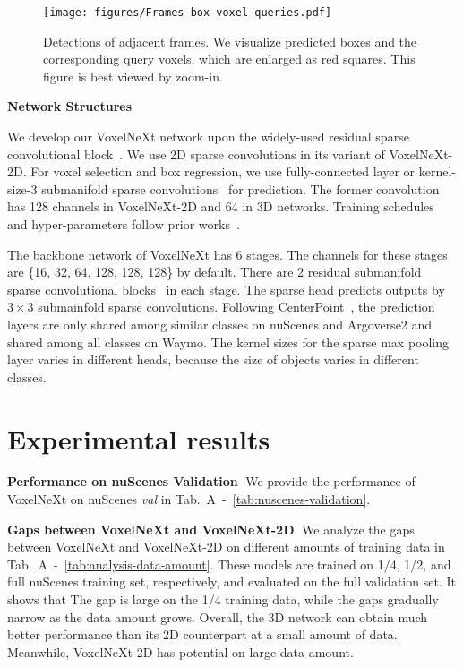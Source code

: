 \documentclass[10pt,twocolumn,letterpaper]{article}
\begin{document}
\begin{figure*}[t]
\begin{center}
   \texttt{[image: figures/Frames-box-voxel-queries.pdf]}
   \caption{Detections of adjacent frames. We visualize predicted boxes and the corresponding query voxels, which are enlarged as red squares. This figure is best viewed by zoom-in.}
   \label{fig:frames-box-query-voxels}
\end{center}
\end{figure*}

\vspace{0.5em}
\noindent
\textbf{Network Structures}

We develop our VoxelNeXt network upon the widely-used residual sparse convolutional block~\cite{centerpoint,pvrcnn,voxel-rcnn}. We use 2D sparse convolutions in its variant of VoxelNeXt-2D. For voxel selection and box regression, we use fully-connected layer or kernel-size-3 submanifold sparse convolutions~\cite{submanifold-sparse-conv-v2} for prediction. The former convolution has 128 channels in VoxelNeXt-2D and 64 in 3D networks. Training schedules and hyper-parameters follow prior works~\cite{pvrcnn,centerpoint}. 

The backbone network of  VoxelNeXt has 6 stages. The channels for these stages are \{16, 32, 64, 128, 128, 128\} by default. There are 2 residual submanifold sparse convolutional blocks~\cite{submanifold-sparse-conv-v2} in each stage. The sparse head predicts outputs by $3\times 3$ submainfold sparse convolutions. Following CenterPoint~\cite{centerpoint}, the prediction layers are only shared among similar classes on nuScenes and Argoverse2 and shared among all classes on Waymo. The kernel sizes for the sparse max pooling layer varies in different heads, because the size of objects varies in different classes.


\section{Experimental results}
\label{sec:experiments-results}
\noindent
\textbf{Performance on nuScenes Validation}$\;$
We provide the performance of VoxelNeXt on nuScenes {\em val} in Tab.~A~-~\ref{tab:nuscenes-validation}.

\vspace{0.5em}
\noindent
\textbf{Gaps between VoxelNeXt and VoxelNeXt-2D}$\;$
We analyze the gaps between VoxelNeXt and VoxelNeXt-2D on different amounts of training data in Tab.~A~-~\ref{tab:analysis-data-amount}. These models are trained on 1/4, 1/2, and full nuScenes training set, respectively, and evaluated on the full validation set. It shows that The gap is large on the 1/4 training data, while the gaps gradually narrow as the data amount grows. Overall, the 3D network can obtain much better performance than its 2D counterpart at a small amount of data. Meanwhile, VoxelNeXt-2D has potential on large data amount.
\end{document}

